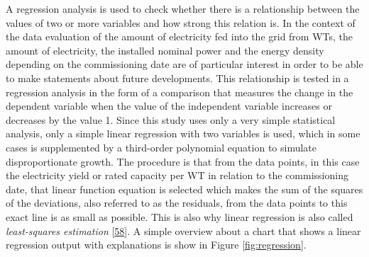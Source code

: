 \documentclass[a4paper,11pt]{article}
\begin{document}
A regression analysis is used to check whether there is a relationship between the values of two or more variables and how strong this relation is. In the context of the data evaluation of the amount of electricity fed into the grid from WTs, the amount of electricity, the installed nominal power and the energy density depending on the commissioning date are of particular interest in order to be able to make statements about future developments. This relationship is tested in a regression analysis in the form of a comparison that measures the change in the dependent variable when the value of the independent variable increases or decreases by the value 1. Since this study uses only a very simple statistical analysis, only a simple linear regression with two variables is used, which in some cases is supplemented by a third-order polynomial equation to simulate disproportionate growth. The procedure is that from the data points, in this case the electricity yield or rated capacity per WT in relation to the commissioning date, that linear function equation is selected which makes the sum of the squares of the deviations, also referred to as the residuals, from the data points to this exact line is as small as possible. This is also why linear regression is also called \emph{least-squares estimation} {[}\protect\hyperlink{ref-NormanMatloff.2017}{58}{]}. A simple overview about a chart that shows a linear regression output with explanations is show in Figure \ref{fig:regression}.
\end{document}
